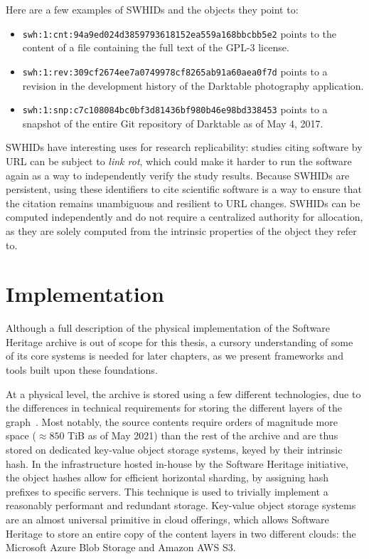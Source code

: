 Here are a few examples of \glspl{SWHID} and the objects they point to:

\begin{itemize}
    \setlength\itemsep{0em}
    \item \texttt{swh:1:cnt:94a9ed024d3859793618152ea559a168bbcbb5e2} points to
        the content of a file containing the full text of the GPL-3 license.
    \item \texttt{swh:1:rev:309cf2674ee7a0749978cf8265ab91a60aea0f7d} points to
        a revision in the development history of the Darktable photography
        application.
    \item \texttt{swh:1:snp:c7c108084bc0bf3d81436bf980b46e98bd338453} points to
        a snapshot of the entire Git repository of Darktable as of May 4, 2017.
\end{itemize}

\glspl{SWHID} have interesting uses for research replicability: studies
citing software by URL can be subject to \emph{link rot}, which could make it
harder to run the software again as a way to independently verify the study
results. Because \glspl{SWHID} are persistent, using these identifiers to cite
scientific software is a way to ensure that the citation remains unambiguous
and resilient to URL changes. \glspl{SWHID} can be computed independently and
do not require a centralized authority for allocation, as they are solely
computed from the intrinsic properties of the object they refer to.

\section{Implementation}%
\label{sec:swh-infrastructure}

Although a full description of the physical implementation of the Software
Heritage archive is out of scope for this thesis, a cursory understanding of
some of its core systems is needed for later chapters, as we present frameworks
and tools built upon these foundations.

At a physical level, the archive is stored using a few different technologies,
due to the differences in technical requirements for storing the different
layers of the graph~\cite{swhipres2017}.
Most notably, the source contents require orders of magnitude more space
($\approx 850$ TiB as of May 2021) than the rest of the archive and are thus
stored on dedicated key-value object storage systems, keyed by their intrinsic
hash.  In the infrastructure hosted in-house by the Software Heritage
initiative, the object hashes allow for efficient horizontal sharding, by
assigning hash prefixes to specific servers. This technique is used to
trivially implement a reasonably performant and redundant storage.
Key-value object storage systems are an almost universal primitive in cloud
offerings, which allows Software Heritage to store an entire copy of the
content layers in two different clouds: the Microsoft Azure Blob Storage and
Amazon AWS S3.

